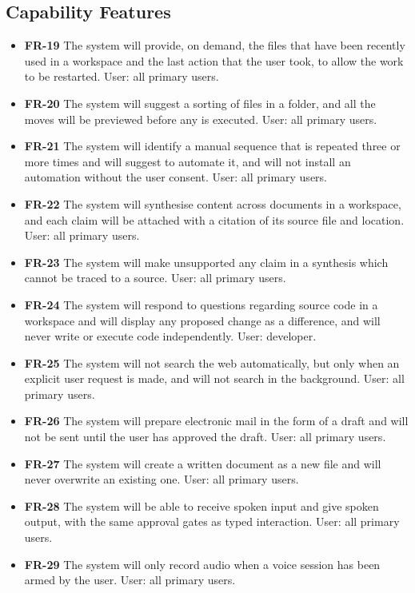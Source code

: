 \documentclass{FastFyp}
\begin{document}
\subsection{Capability Features}
\begin{itemize}
    \item \textbf{FR-19} The system will provide, on demand, the files that have been recently used in a workspace and the last action that the user took, to allow the work to be restarted. User: all primary users.
    \item \textbf{FR-20} The system will suggest a sorting of files in a folder, and all the moves will be previewed before any is executed. User: all primary users.
    \item \textbf{FR-21} The system will identify a manual sequence that is repeated three or more times and will suggest to automate it, and will not install an automation without the user consent. User: all primary users.
    \item \textbf{FR-22} The system will synthesise content across documents in a workspace, and each claim will be attached with a citation of its source file and location. User: all primary users.
    \item \textbf{FR-23} The system will make unsupported any claim in a synthesis which cannot be traced to a source. User: all primary users.
    \item \textbf{FR-24} The system will respond to questions regarding source code in a workspace and will display any proposed change as a difference, and will never write or execute code independently. User: developer.
    \item \textbf{FR-25} The system will not search the web automatically, but only when an explicit user request is made, and will not search in the background. User: all primary users.
    \item \textbf{FR-26} The system will prepare electronic mail in the form of a draft and will not be sent until the user has approved the draft. User: all primary users.
    \item \textbf{FR-27} The system will create a written document as a new file and will never overwrite an existing one. User: all primary users.
    \item \textbf{FR-28} The system will be able to receive spoken input and give spoken output, with the same approval gates as typed interaction. User: all primary users.
    \item \textbf{FR-29} The system will only record audio when a voice session has been armed by the user. User: all primary users.
\end{itemize}
\end{document}

